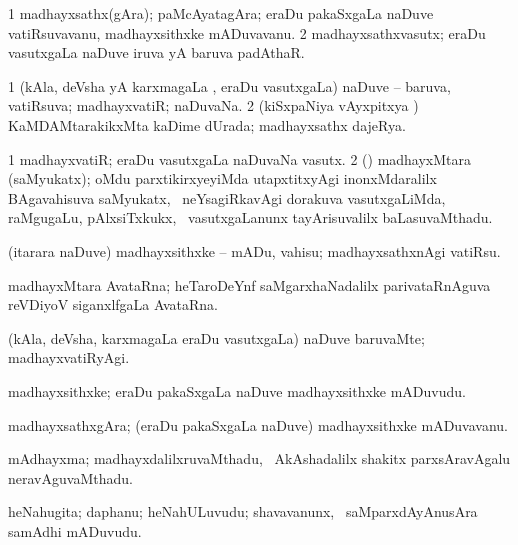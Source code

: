 \bentry
{}
\gl{\nA}
\bmng
\bnum
\num{1} madhayxsathx(gAra); paMcAyatagAra; eraDu pakaSxgaLa naDuve vatiRsuvavanu, madhayxsithxke mADuvavanu. 
\num{2} madhayxsathxvasutx; eraDu vasutxgaLa naDuve iruva yA baruva padAthaR. 
\enum
\emng
\eentry

\bentry
{}
\gl{\gu}
\bmng
\bnum
\num{1} (kAla, deVsha yA karxmagaLa \vi, eraDu vasutxgaLa) naDuve -- baruva, vatiRsuva; madhayxvatiR; naDuvaNa. 
\num{2} (kiSxpaNiya vAyxpitxya \vi) KaMDAMtarakikxMta kaDime dUrada; madhayxsathx dajeRya. 
\enum
\emng
\eentry

\bentry
{}
\gl{\nA}
\bmng
\bnum
\num{1} madhayxvatiR; eraDu vasutxgaLa naDuvaNa vasutx. 
\num{2} (\ravi) madhayxMtara (saMyukatx); oMdu parxtikirxyeyiMda utapxtitxyAgi inonxMdaralilx BAgavahisuva saMyukatx, \kanmu\ neYsagiRkavAgi dorakuva vasutxgaLiMda, raMgugaLu, pAlxsiTxkukx, \mo\ vasutxgaLanunx tayArisuvalilx baLasuvaMthadu. 
\enum
\emng
\eentry

\bentry
{}
\gl{\akirx}
\bmng
(itarara naDuve) madhayxsithxke -- mADu, vahisu; madhayxsathxnAgi vatiRsu. 
\emng
\eentry

\bentry
{}
\gl{\nA}
\bmng
madhayxMtara AvataRna; heTaroDeYnf saMgarxhaNadalilx parivataRnAguva reVDiyoV siganxlfgaLa AvataRna. 
\emng
\eentry

\bentry
{}
\gl{\kirxvi}
\bmng
(kAla, deVsha, karxmagaLa \vi eraDu vasutxgaLa) naDuve baruvaMte; madhayxvatiRyAgi. 
\emng
\eentry

\bentry
{}
\gl{\nA}
\bmng
madhayxsithxke; eraDu pakaSxgaLa naDuve madhayxsithxke mADuvudu. 
\emng
\eentry

\bentry
{}
\gl{\nA}
\bmng
madhayxsathxgAra; (eraDu pakaSxgaLa naDuve) madhayxsithxke mADuvavanu. 
\emng
\eentry

\bentry
{}
\gl{\nA}
\bmng
mAdhayxma; madhayxdalilxruvaMthadu, \kanmu\ AkAshadalilx shakitx parxsAravAgalu neravAguvaMthadu. 
\emng
\eentry

\bentry
{}
\gl{\nA}
\bmng
heNahugita; daphanu; heNahULuvudu; shavavanunx, \kanmu\ saMparxdAyAnusAra samAdhi mADuvudu. 
\emng
\eentry


